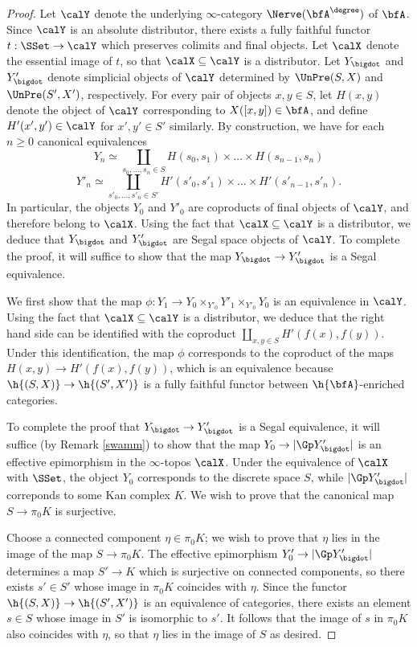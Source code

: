 \begin{proof}
Let $\calY$ denote the underlying $\infty$-category $\Nerve( \bfA^{\degree} )$ of $\bfA$.
Since $\calY$ is an absolute distributor, there exists a fully faithful functor $t: \SSet \rightarrow \calY$ which preserves colimits and final objects. Let $\calX$ denote the essential image of $t$, so that
$\calX \subseteq \calY$ is a distributor. Let $Y_{\bigdot}$ and $Y'_{\bigdot}$ denote simplicial objects of $\calY$ determined by $\UnPre(S,X)$ and $\UnPre(S',X')$, respectively. 
For every pair of objects $x,y \in S$, let $H(x,y)$ denote the object of $\calY$ corresponding to
$X([x,y]) \in \bfA$, and define $H'(x',y') \in \calY$ for $x',y' \in S'$ similarly. By construction, we have
for each $n \geq 0$ canonical equivalences
$$ Y_n \simeq \coprod_{ s_0, \ldots, s_n \in S} H(s_0, s_1) \times \ldots \times H(s_{n-1}, s_n)$$
$$ Y'_n \simeq \coprod_{ s'_0, \ldots, s'_n \in S'} H'(s'_0, s'_1) \times \ldots \times H'( s'_{n-1}, s'_n).$$
In particular, the objects $Y_0$ and $Y'_0$ are coproducts of final objects of $\calY$, and therefore belong to $\calX$. Using the fact that $\calX \subseteq \calY$ is a distributor, we deduce
that $Y_{\bigdot}$ and $Y'_{\bigdot}$ are Segal space objects of $\calY$. 
To complete the proof, it will suffice to show that the map $Y_{\bigdot} \rightarrow Y'_{\bigdot}$ is a Segal equivalence. 

We first show that the map $\phi: Y_1 \rightarrow Y_0 \times_{Y'_0} Y'_1 \times_{Y'_0} Y_0$
is an equivalence in $\calY$. Using the fact that $\calX \subseteq \calY$ is a distributor, 
we deduce that the right hand side can be identified with the coproduct
$\coprod_{ x,y \in S} H'(f(x),f(y)).$ Under this identification, the map $\phi$ corresponds to the coproduct of the maps $H(x,y) \rightarrow H'( f(x), f(y) )$, which is an equivalence because 
$\h{(S,X)} \rightarrow \h{(S',X')}$ is a fully faithful functor between $\h{\bfA}$-enriched categories.

To complete the proof that $Y_{\bigdot} \rightarrow Y'_{\bigdot}$ is a Segal equivalence, it will suffice (by Remark \ref{swamm}) to show that the map $Y_0 \rightarrow | \Gp Y'_{\bigdot} |$ is an effective epimorphism in the $\infty$-topos $\calX$. Under the equivalence of $\calX$ with
$\SSet$, the object $Y_0$ corresponds to the discrete space $S$, while $| \Gp Y'_{\bigdot} |$ correponds to some Kan complex $K$. We wish to prove that the canonical map
$S \rightarrow \pi_0 K$ is surjective. 

Choose a connected component $\eta \in \pi_0 K$; we wish to prove that
$\eta$ lies in the image of the map $S \rightarrow \pi_0 K$.
The effective epimorphism $Y'_0 \rightarrow | \Gp Y'_{\bigdot} |$ determines a map
$S' \rightarrow K$ which is surjective on connected components, so there exists
$s' \in S'$ whose image in $\pi_0 K$ coincides with $\eta$. Since the functor $\h{ (S,X)} \rightarrow \h{(S',X')}$ is an equivalence of categories, there exists an element $s \in S$ whose image in $S'$ is
isomorphic to $s'$. It follows that the image of $s$ in $\pi_0 K$ also coincides with $\eta$, so that
$\eta$ lies in the image of $S$ as desired.
\end{proof}




